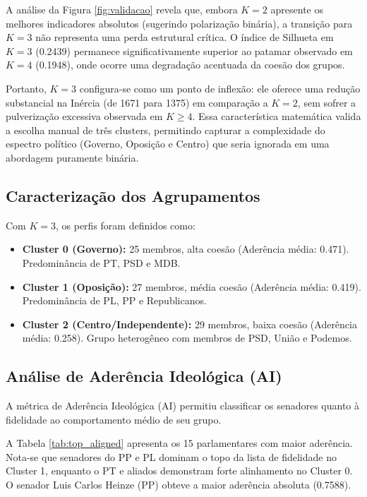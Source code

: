 \documentclass[conference]{IEEEtran}
\begin{document}
A análise da Figura \ref{fig:validacao} revela que, embora $K=2$ apresente os melhores indicadores absolutos (sugerindo polarização binária), a transição para $K=3$ não representa uma perda estrutural crítica. O índice de Silhueta em $K=3$ (0.2439) permanece significativamente superior ao patamar observado em $K=4$ (0.1948), onde ocorre uma degradação acentuada da coesão dos grupos.

Portanto, $K=3$ configura-se como um ponto de inflexão: ele oferece uma redução substancial na Inércia (de 1671 para 1375) em comparação a $K=2$, sem sofrer a pulverização excessiva observada em $K \ge 4$. Essa característica matemática valida a escolha manual de três clusters, permitindo capturar a complexidade do espectro político (Governo, Oposição e Centro) que seria ignorada em uma abordagem puramente binária.




\subsection{Caracterização dos Agrupamentos}

Com $K=3$, os perfis foram definidos como:
\begin{itemize}
    \item \textbf{Cluster 0 (Governo):} 25 membros, alta coesão (Aderência média: 0.471). Predominância de PT, PSD e MDB.
    \item \textbf{Cluster 1 (Oposição):} 27 membros, média coesão (Aderência média: 0.419). Predominância de PL, PP e Republicanos.
    \item \textbf{Cluster 2 (Centro/Independente):} 29 membros, baixa coesão (Aderência média: 0.258). Grupo heterogêneo com membros de PSD, União e Podemos.
\end{itemize}

\subsection{Análise de Aderência Ideológica (AI)}

A métrica de Aderência Ideológica (AI) permitiu classificar os senadores quanto à fidelidade ao comportamento médio de seu grupo.

A Tabela \ref{tab:top_aligned} apresenta os 15 parlamentares com maior aderência. Nota-se que senadores do PP e PL dominam o topo da lista de fidelidade no Cluster 1, enquanto o PT e aliados demonstram forte alinhamento no Cluster 0. O senador Luis Carlos Heinze (PP) obteve a maior aderência absoluta (0.7588).
\end{document}
